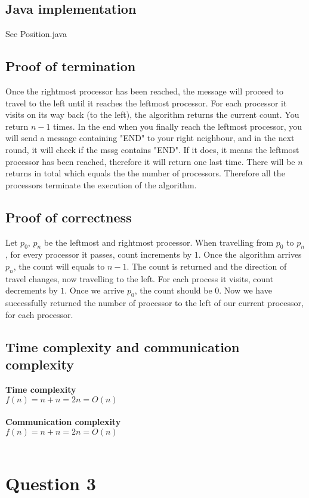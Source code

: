\documentclass[12pt,letterpaper]{article}
\begin{document}
\subsection* {Java implementation}
See Position.java
\subsection* {Proof of termination}
Once the rightmost processor has been reached, the message will proceed to travel to the left until it reaches the leftmost processor. For each processor it visits on its way back (to the left), the algorithm returns the current count. You return $n-1$ times. In the end when you finally reach the leftmost processor, you will send a message containing "END" to your right neighbour, and in the next round, it will check if the mssg contains "END". If it does, it means the leftmost processor has been reached, therefore it will return one last time. There will be $n$ returns in total which equals the the number of processors. Therefore all the processors terminate the execution of the algorithm.
\subsection* {Proof of correctness}
Let $p_{0}$, $p_{n}$ be the leftmost and rightmost processor. When travelling from $p_{0}$ to $p_{n}$, for every processor it passes, count increments by $1$. Once the algorithm arrives $p_{n}$, the count will equals to $n-1$. The count is returned and the direction of travel changes, now travelling to the left. For each process it visits, count decrements by $1$. Once we arrive $p_{0}$, the count should be $0$. Now we have successfully returned the number of processor to the left of our current processor, for each processor. 
\subsection* {Time complexity and communication complexity}
\textbf{Time complexity} \\
$f(n) = n + n = 2n = O(n)$ \\ \\
\textbf{Communication complexity} \\
$f(n) = n + n = 2n = O(n)$ \\ \\
\newpage

\section*{Question 3}
\end{document}
